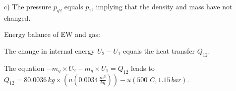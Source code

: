 c) The pressure \( p_{g2} \) equals \( p_1 \), implying that the density and mass have not changed.

Energy balance of EW and gas:

The change in internal energy \( U_2 - U_1 \) equals the heat transfer \( Q_{12} \).

The equation \(-m_g \times U_2 - m_g \times U_1 = Q_{12}\) leads to \( Q_{12} = 80.0036 \, kg \times \left( u(0.0034 \, \frac{m^3}{kg}) \right) - u(500^\circ C, 1.15 \, bar)\).